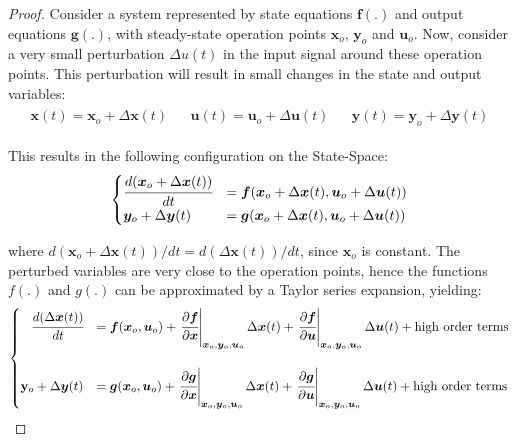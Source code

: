 \documentclass[a4paper,11pt]{book}
\numberwithin{figure}{chapter}
\numberwithin{equation}{chapter}
\numberwithin{table}{chapter}
\theoremstyle{definition}
\begin{document}
\begin{proof}
	Consider a system represented by state equations $\bm{f}(.)$ and output equations $\bm{g}(.)$, with steady-state operation points $\bm{x}_o$, $\bm{y}_o$ and $\bm{u}_o$. Now, consider a very small perturbation $\Delta u(t)$ in the input signal around these operation points. This perturbation will result in small changes in the state and output variables:
	\begin{align}
	\begin{matrix}
		\bm{x}(t) = \bm{x}_o + \Delta \bm{x}(t) & &
		\bm{u}(t) = \bm{u}_o + \Delta \bm{u}(t) & &
		\bm{y}(t) = \bm{y}_o + \Delta \bm{y}(t)
	\end{matrix}
	\end{align}
	
	This results in the following configuration on the State-Space:
	\begin{align}
	\begin{cases}
		\cfrac{d(\bm{x}_o + \Delta \bm{x}(t))}{dt} &= \bm{f}(\bm{x}_o + \Delta \bm{x}(t), \bm{u}_o + \Delta \bm{u}(t) ) \\
		\bm{y}_o + \Delta \bm{y}(t) &= \bm{g}(\bm{x}_o + \Delta \bm{x}(t), \bm{u}_o + \Delta \bm{u}(t) ) \\
	\end{cases}
	\end{align}
	
	\noindent where $d(\bm{x}_o + \Delta \bm{x}(t)) / dt = d(\Delta \bm{x}(t)) / dt$, since $\bm{x}_o$ is constant. The perturbed variables are very close to the operation points, hence the functions $f(.)$ and $g(.)$ can be approximated by a Taylor series expansion, yielding:
	\begin{align}
	\begin{cases}
		\hfill \cfrac{d(\Delta \bm{x}(t))}{dt} &= \bm{f}(\bm{x}_o, \bm{u}_o) + \left. \cfrac{\partial \bm{f}}{\partial \bm{x}}\right\vert_{\bm{x}_o, \bm{y}_o, \bm{u}_o} \Delta \bm{x}(t) + \left. \cfrac{\partial \bm{f}}{\partial \bm{u}}\right\vert_{\bm{x}_o, \bm{y}_o, \bm{u}_o}  \Delta \bm{u}(t) + \text{high order terms} \\ \\
		\mathbf{y}_o + \Delta \bm{y}(t) &= \bm{g}(\bm{x}_o, \bm{u}_o) + \left. \cfrac{\partial \bm{g}}{\partial \bm{x}}\right\vert_{\bm{x}_o, \bm{y}_o, \bm{u}_o} \Delta \bm{x}(t) + \left. \cfrac{\partial \bm{g}}{\partial \bm{u}}\right\vert_{\bm{x}_o, \bm{y}_o, \bm{u}_o}  \Delta \bm{u}(t) + \text{high order terms} \\
	\end{cases}
	\end{align}
	

\end{proof}
\end{document}
